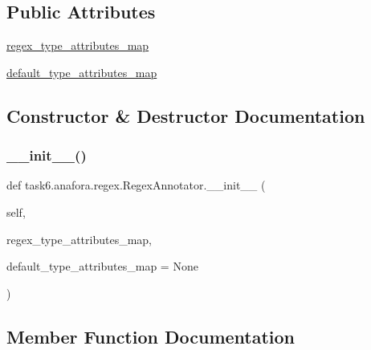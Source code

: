 \subsection*{Public Attributes}
\begin{DoxyCompactItemize}
\item 
\hyperlink{classtask6_1_1anafora_1_1regex_1_1RegexAnnotator_a01da64138702436e84e00de752e065e8}{regex\+\_\+type\+\_\+attributes\+\_\+map}
\item 
\hyperlink{classtask6_1_1anafora_1_1regex_1_1RegexAnnotator_ae2480f04c3c25ad145dc4738ca7d7df8}{default\+\_\+type\+\_\+attributes\+\_\+map}
\end{DoxyCompactItemize}


\subsection{Constructor \& Destructor Documentation}
\mbox{\label{classtask6_1_1anafora_1_1regex_1_1RegexAnnotator_a3ee5a8a515d009200169587e66d17a8c}} 
\subsubsection{\texorpdfstring{\+\_\+\+\_\+init\+\_\+\+\_\+()}{\_\_init\_\_()}}
{\footnotesize\ttfamily def task6.\+anafora.\+regex.\+Regex\+Annotator.\+\_\+\+\_\+init\+\_\+\+\_\+ (\begin{DoxyParamCaption}\item[{}]{self,  }\item[{}]{regex\+\_\+type\+\_\+attributes\+\_\+map,  }\item[{}]{default\+\_\+type\+\_\+attributes\+\_\+map = {\ttfamily None} }\end{DoxyParamCaption})}



\subsection{Member Function Documentation}
\mbox{\label{classtask6_1_1anafora_1_1regex_1_1RegexAnnotator_ad2dc1278ff2bd78a9a5316f8c9116a86}} 
